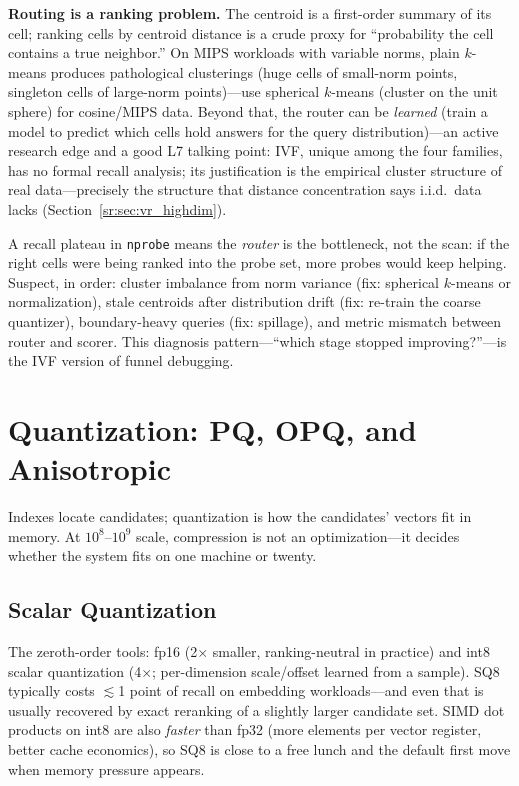 \textbf{Routing is a ranking problem.} The centroid is a first-order summary of its cell; ranking cells by centroid distance is a crude proxy for ``probability the cell contains a true neighbor.'' On MIPS workloads with variable norms, plain $k$-means produces pathological clusterings (huge cells of small-norm points, singleton cells of large-norm points)---use spherical $k$-means (cluster on the unit sphere) for cosine/MIPS data. Beyond that, the router can be \emph{learned} (train a model to predict which cells hold answers for the query distribution)---an active research edge and a good L7 talking point: IVF, unique among the four families, has no formal recall analysis; its justification is the empirical cluster structure of real data---precisely the structure that distance concentration says i.i.d.\ data lacks (Section~\ref{sr:sec:vr_highdim}).

\begin{keyinsight}
A recall plateau in \texttt{nprobe} means the \emph{router} is the bottleneck, not the scan: if the right cells were being ranked into the probe set, more probes would keep helping. Suspect, in order: cluster imbalance from norm variance (fix: spherical $k$-means or normalization), stale centroids after distribution drift (fix: re-train the coarse quantizer), boundary-heavy queries (fix: spillage), and metric mismatch between router and scorer. This diagnosis pattern---``which stage stopped improving?''---is the IVF version of funnel debugging.
\end{keyinsight}

\section{Quantization: PQ, OPQ, and Anisotropic}
\label{sr:sec:vr_quant}

Indexes locate candidates; quantization is how the candidates' vectors fit in memory. At $10^8$--$10^9$ scale, compression is not an optimization---it decides whether the system fits on one machine or twenty.

\subsection{Scalar Quantization}

The zeroth-order tools: fp16 (2$\times$ smaller, ranking-neutral in practice) and int8 scalar quantization (4$\times$; per-dimension scale/offset learned from a sample). SQ8 typically costs $\lesssim$1 point of recall on embedding workloads---and even that is usually recovered by exact reranking of a slightly larger candidate set. SIMD dot products on int8 are also \emph{faster} than fp32 (more elements per vector register, better cache economics), so SQ8 is close to a free lunch and the default first move when memory pressure appears.

